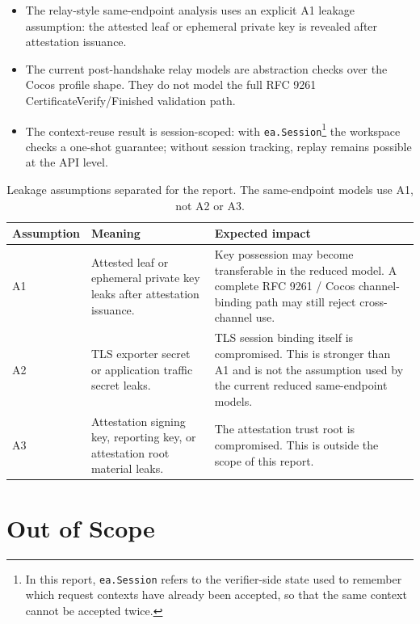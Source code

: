 \documentclass[11pt,a4paper]{article}
\begin{document}
\begin{itemize}
\item The relay-style same-endpoint analysis uses an explicit A1 leakage
assumption: the attested leaf or ephemeral private key is revealed after
attestation issuance.
\item The current post-handshake relay models are abstraction checks over the
Cocos profile shape. They do not model the full RFC 9261
CertificateVerify/Finished validation path.
\item The context-reuse result is session-scoped: with
\texttt{ea.Session}\footnote{In this report, \texttt{ea.Session} refers to the
verifier-side state used to remember which request contexts have already been
accepted, so that the same context cannot be accepted twice.} the
workspace checks a one-shot guarantee; without session tracking, replay remains
possible at the API level.
\end{itemize}

\begin{table}[H]
\centering
\footnotesize
\begin{tabularx}{\textwidth}{@{}>{\raggedright\arraybackslash}p{}>{\raggedright\arraybackslash}p{}>{\raggedright\arraybackslash}X@{}}
\toprule
\textbf{Assumption} & \textbf{Meaning} & \textbf{Expected impact} \\
\midrule
A1 & Attested leaf or ephemeral private key leaks after attestation issuance. & Key possession may become transferable in the reduced model. A complete RFC 9261 / Cocos channel-binding path may still reject cross-channel use. \\
A2 & TLS exporter secret or application traffic secret leaks. & TLS session binding itself is compromised. This is stronger than A1 and is not the assumption used by the current reduced same-endpoint models. \\
A3 & Attestation signing key, reporting key, or attestation root material leaks. & The attestation trust root is compromised. This is outside the scope of this report. \\
\bottomrule
\end{tabularx}
\caption{Leakage assumptions separated for the report. The same-endpoint models use A1, not A2 or A3.}
\label{tab:leakage-assumptions}
\end{table}

\section{Out of Scope}
\end{document}
